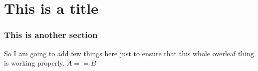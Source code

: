 
\chapter{This is a title}
\subsection{This is another section}
So I am going to add few things here just to ensure that this whole overleaf thing is working properly.
$A == B$